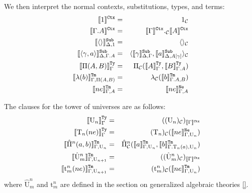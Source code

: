 \documentclass{lmcs}
\def\UU{\mathrm{U}}
\def\Ta{\mathrm{T}}
\def\Pihat{\hat{\Pi}}
\def\UUhat{\hat{\UU}}
\def\t{\mathrm{t}}
\def\RawNe{\texttt{Ne}}
\def\Ty{\mathrm{Ty}}
\def\Tm{\mathrm{Tm}}
\def\id{\mathrm{id}}
\def\p{\mathrm{p}}
\newcommand{\intCtxU}[1]{\llbracket #1 \rrbracket^\RawCtx}
\newcommand{\intSubU}[1]{\llbracket #1 \rrbracket^\RawSub}
\newcommand{\intTyU}[1]{\llbracket #1 \rrbracket^\RawTy}
\newcommand{\intTmU}[1]{\llbracket #1 \rrbracket^\RawTm}
\newcommand{\intNeU}[1]{\llbracket #1 \rrbracket^\RawNe}
\begin{document}
We then interpret the normal contexts, substitutions, types, and terms:
\begin{eqnarray*}
\intCtxU{1} &=& 1_\C\\
\intCtxU { \Gamma .A} &=& \intCtxU \Gamma ._\C \intCtxU{A}\\
\intSubU{ \langle  \rangle }_{\Delta,1} &=& \langle \rangle_\C\\
\intSubU{ \langle  \gamma , a \rangle }_{\Delta,\Gamma.A} &=& \langle \intSubU{\gamma}_{\Delta,\Gamma} , \intSubU{a}_{\Delta,A[\gamma]} \rangle_\C\\
\intTyU{\Pi(A,B)}_\Gamma&=& \Pi_\C(\intTyU{A}_\Gamma,\intTyU{B}_{\Gamma.A})\\
\intTmU{\lambda(b)}_{\Gamma,\Pi(A,B)} &=& \lambda_\C(\intTmU{b}_{\Gamma.A, B})\\
\intTmU{ne}_{\Gamma,A} &=& \intNeU{ne}_{\Gamma,A}
\end{eqnarray*}

The clauses for the tower of universes are as follows:
\begin{eqnarray*}
\intTyU{\UU_n}_\Gamma &=& ((\UU_n)_\C)_{\intCtxU{\Gamma}}\\ %
\intTyU{\Ta_n(ne)}_\Gamma &=& (\Ta_n)_\C(\intNeU{ne}_{\Gamma,\UU_n})\\%
\intTmU{\Pihat^n(a,b)}_{\Gamma,\UU_n}&=& \Pihat^n_\C(\intTmU{a}_{\Gamma,\UU_n},\intTmU{b}_{\Gamma.\Ta_n(a),\UU_n})\\%
\intTmU{\hat{\UU}^n_m}_{\Gamma,\UU_{n+1}} &=& ((\UUhat^n_m)_\C)_{\intCtxU{\Gamma}}\\%
\intTmU{\t^n_m(ne)}_{\Gamma,\UU_{n+1}} &=& 
(\t^n_m)_\C(\intTmU{ne}_{\Gamma,\UU_n})%
\end{eqnarray*}
where $\UUhat^n_m$ and $\t^n_m$ are defined in the section on generalized algebraic theories \ref{}.
\end{document}
